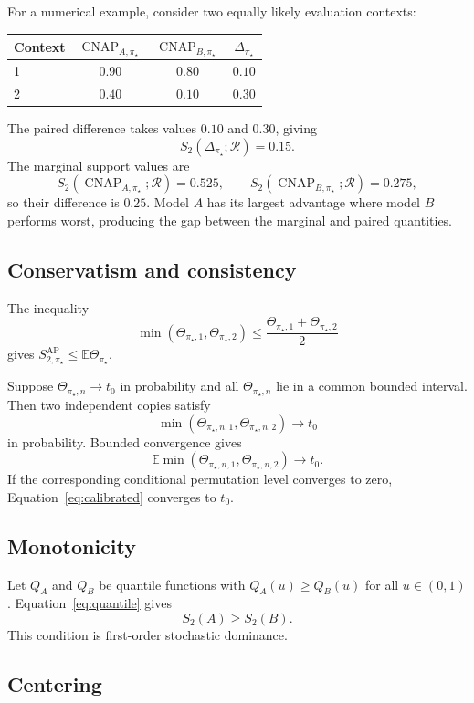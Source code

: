 \documentclass[11pt]{article}
\newcommand{\CNAP}{\operatorname{CNAP}}
\newcommand{\Regime}{\mathcal{R}}
\newcommand{\E}{\mathbb{E}}
\newcommand{\SAP}{S_{2,\pi_\star}^{\mathrm{AP}}}
\theoremstyle{remark}
\begin{document}
For a numerical example, consider two equally likely evaluation contexts:
\begin{center}
\begin{tabular}{@{}lccc@{}}
\toprule
Context & $\CNAP_{A,\pi_\star}$ & $\CNAP_{B,\pi_\star}$ & $\Delta_{\pi_\star}$ \\
\midrule
1 & $0.90$ & $0.80$ & $0.10$ \\
2 & $0.40$ & $0.10$ & $0.30$ \\
\bottomrule
\end{tabular}
\end{center}
The paired difference takes values $0.10$ and $0.30$, giving
\[
S_2(\Delta_{\pi_\star};\Regime)=0.15.
\]
The marginal support values are
\[
S_2(\CNAP_{A,\pi_\star};\Regime)=0.525,
\qquad
S_2(\CNAP_{B,\pi_\star};\Regime)=0.275,
\]
so their difference is $0.25$. Model $A$ has its largest advantage where model $B$ performs worst, producing the gap between the marginal and paired quantities.

\subsection{Conservatism and consistency}

The inequality
\[
\min(\Theta_{\pi_\star,1},\Theta_{\pi_\star,2})
\leq
\frac{\Theta_{\pi_\star,1}+\Theta_{\pi_\star,2}}{2}
\]
gives $\SAP\leq\E\Theta_{\pi_\star}$.

Suppose $\Theta_{\pi_\star,n}\to t_0$ in probability and all $\Theta_{\pi_\star,n}$ lie in a common bounded interval. Then two independent copies satisfy
\[
\min(\Theta_{\pi_\star,n,1},\Theta_{\pi_\star,n,2})\to t_0
\]
in probability. Bounded convergence gives
\[
\E\min(\Theta_{\pi_\star,n,1},\Theta_{\pi_\star,n,2})\to t_0.
\]
If the corresponding conditional permutation level converges to zero, Equation~\eqref{eq:calibrated} converges to $t_0$.

\subsection{Monotonicity}

Let $Q_A$ and $Q_B$ be quantile functions with $Q_A(u)\geq Q_B(u)$ for all $u\in(0,1)$. Equation~\eqref{eq:quantile} gives
\[
S_2(A)\geq S_2(B).
\]
This condition is first-order stochastic dominance.

\subsection{Centering}
\label{app:centering}
\end{document}

